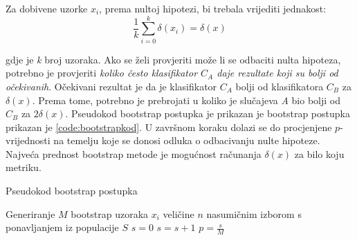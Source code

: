 Za dobivene uzorke $x_i$, prema nultoj hipotezi, bi trebala vrijediti jednakost:
\begin{equation}
\label{eq:jednakost_delta}
\frac{1}{k}\sum_{i=0}^{k}\delta(x_i) = \delta(x)
\end{equation}

gdje je \textit{k} broj uzoraka. Ako se želi provjeriti može li se odbaciti nulta hipoteza, potrebno je provjeriti \textit{koliko često klasifikator $C_A$ daje rezultate koji su bolji od očekivanih}. Očekivani rezultat je da je klasifikator $C_A$ bolji od klasifikatora $C_B$ za $\delta(x)$. Prema tome, potrebno je prebrojati u koliko je slučajeva \textit{A} bio bolji od $C_B$ za $2\delta(x)$. Pseudokod bootstrap postupka je prikazan je \citep{berg2012empirical} bootstrap postupka prikazan je \ref{code:bootstrapkod}. U završnom koraku dolazi se do procjenjene $p$-vrijednosti na temelju koje se donosi odluka o odbacivanju nulte hipoteze. Najveća prednost bootstrap metode je mogućnost računanja $\delta(x)$ za bilo koju metriku. 

\begin{algorithm}
\caption{Pseudokod bootstrap postupka}\label{code:bootstrapkod}
\begin{algorithmic}[1]
\State Generiranje $M$ bootstrap uzoraka $x_i$ veličine $n$ nasumičnim izborom s ponavljanjem iz populacije $S$
\State $s=0$
\Repeat 
{}
\State $s=s+1$
\EndIf
{}
\State $p=\frac{s}{M}$
\end{algorithmic}
\end{algorithm}




